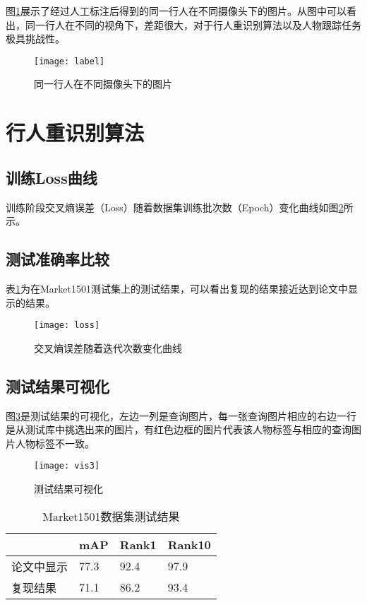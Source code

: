 图\ref{fig:label}展示了经过人工标注后得到的同一行人在不同摄像头下的图片。从图中可以看出，同一行人在不同的视角下，差距很大，对于行人重识别算法以及人物跟踪任务极具挑战性。

\begin{figure}
\centering
\texttt{[image: label]}
\caption{同一行人在不同摄像头下的图片}
\label{fig:label}
\end{figure}

\section{行人重识别算法}

\subsection{训练Loss曲线}

训练阶段交叉熵误差（Loss）随着数据集训练批次数（Epoch）变化曲线如图\ref{fig:loss}所示。

\subsection{测试准确率比较}

表\ref{tab:test}为在Market1501测试集上的测试结果，可以看出复现的结果接近达到论文中显示的结果。

\begin{figure}[]
\centering
\texttt{[image: loss]}
\caption{交叉熵误差随着迭代次数变化曲线}
\label{fig:loss}
\end{figure}

\subsection{测试结果可视化}

图\ref{fig:testvis}是测试结果的可视化，左边一列是查询图片，每一张查询图片相应的右边一行是从测试库中挑选出来的图片，有红色边框的图片代表该人物标签与相应的查询图片人物标签不一致。

\begin{figure}
\centering
\texttt{[image: vis3]}
\caption{测试结果可视化}
\label{fig:testvis}
\end{figure}

\begin{table}[h!]
    \centering
    \caption{Market1501数据集测试结果}
    \label{tab:test}
    \begin{tabularx}{\textwidth}{XXXX}
    \toprule
               & mAP   & Rank1 & Rank10 \\ \midrule
    论文中显示  & 77.3  & 92.4  & 97.9   \\
    复现结果    & 71.1  & 86.2  & 93.4   \\ \bottomrule
    \end{tabularx}
\end{table}

